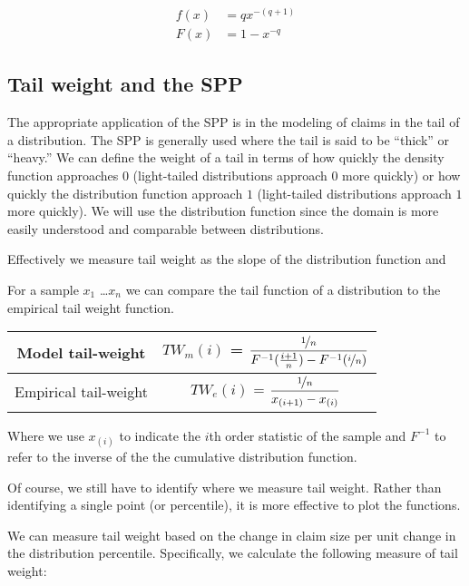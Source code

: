 \begin{align}
		f(x) & =  qx^{-(q+1)}\label{SPPf}\\
		F(x) & =  1 - x^{-q}\label{SPPF}
\end{align}

\subsection{Tail weight and the SPP}
The appropriate application of the SPP is in the modeling of claims in the tail of a distribution. The SPP is generally used where the tail is said to be ``thick'' or ``heavy.'' We can define the weight of a tail in terms of how quickly the density function approaches $0$ (light-tailed distributions approach $0$ more quickly) or how quickly the distribution function approach $1$ (light-tailed distributions approach $1$ more quickly). We will use the distribution function since the domain is more easily understood and comparable between distributions. 

Effectively we measure tail weight as the slope of the distribution function and 

For a sample $x_1$ \ldots $x_n$ we can compare the tail function of a distribution to the empirical tail weight function.
\begin{table}[h!]
	\centering
	\begin{tabular}[h]{cc}
	\toprule
	Model tail-weight & $TW_m(i)$ = 
	$\dfrac{
		\nicefrac{1}{n} %
	}{
		F^{-1}(\frac{i+1}{n}) %
		- F^{-1}(\nicefrac{i}{n}) %
	}$\\
	\midrule
	Empirical tail-weight & $TW_e(i)$ = 
	$\dfrac{
		\nicefrac{1}{n}
	}{
		{x_{(i+1)}}-{x_{(i)}}
	}$\\
	\bottomrule
	\end{tabular}
\end{table}

Where we use $x_{(i)}$ to indicate the $i$th order statistic of the sample and $F^{-1}$ to refer to the inverse of the the cumulative distribution function.

Of course, we still have to identify where we measure tail weight. Rather than identifying a single point (or percentile), it is more effective to plot the functions.





We can measure tail weight based on the change in claim size per unit change in the distribution percentile. Specifically, we calculate the following measure of tail weight:

